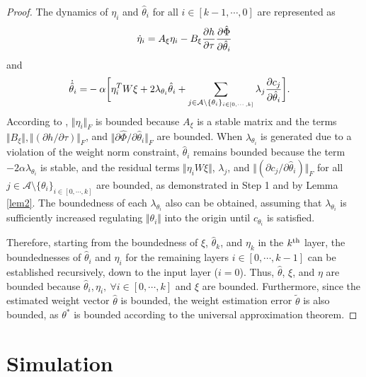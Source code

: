 \documentclass[lettersize,journal]{IEEEtran}
\begin{document}
\begin{proof}
The dynamics of $\eta_i$ and $\hat\theta_i$ for all $i\in [k-1,\cdots,0]$ are represented as
\begin{equation}
    \dot\eta_i = 
    A_\xi\eta_i -B_\xi {\partial h\over\partial\tau}
    {\partial \hat\Phi\over \partial \hat\theta_i}
\end{equation}
and
\begin{equation}
    \begin{aligned}
        \dot{\hat\theta}_i 
        =&
        -\alpha 
        \bigg[
            \eta_i^TW\xi+2\lambda_{\theta_i} \hat\theta_i
            +
            \sum_{j\in\mathcal{A}\setminus \{\theta_i\}_{i\in[0,\cdots,k]}}\lambda_j{\partial c_j\over\partial \hat\theta_i}
        \bigg].
    \end{aligned}
\end{equation}
According to \cite[Chap.~4 T.~1.9]{RN13}, $\Vert\eta_i\Vert_F$ is bounded because $A_\xi$ is a stable matrix and the terms $\Vert B_\xi\Vert, \Vert(\partial h/\partial \tau)\Vert_F$, and $\Vert\partial \hat\Phi/\partial\hat\theta_i\Vert_F$ are bounded.
When $\lambda_{\theta_i}$ is generated due to a violation of the weight norm constraint, $\hat\theta_i$ remains bounded because the term $-2\alpha\lambda_{\theta_i}$ is stable, and the residual terms $\Vert\eta_iW\xi\Vert$, $\lambda_j$, and $\Vert(\partial c_j/\partial \hat\theta_i)\Vert_F$ for all $j\in\mathcal{A}\setminus \{\theta_i\}_{i\in[0,\cdots,k]}$ are bounded, as demonstrated in Step 1 and by Lemma \ref{lem2}.
The boundedness of each $\lambda_{\theta_i}$ also can be obtained, assuming that $\lambda_{\theta_i}$ is sufficiently increased regulating $\Vert\theta_i\Vert$ into the origin until $c_{\theta_i}$ is satisfied.

Therefore, starting from the boundedness of $\xi$, $\hat\theta_k$, and $\eta_k$ in the $k\textsuperscript{th}$ layer, the boundednesses of $\hat\theta_i$ and $\eta_i$ for the remaining layers $i\in[0,\cdots,k-1]$ can be established recursively, down to the input layer ($i=0$). Thus, $\hat\theta$, $\xi$, and $\eta$ are bounded because $\hat\theta_i,\eta_i,\ \forall i\in[0,\cdots,k]$ and $\xi$ are bounded. Furthermore, since the estimated weight vector $\hat\theta$ is bounded, the weight estimation error $\tilde\theta$ is also bounded, as $\theta^*$ is bounded according to the universal approximation theorem.

\end{proof}

\section{Simulation}\label{sec:sim}
\end{document}
